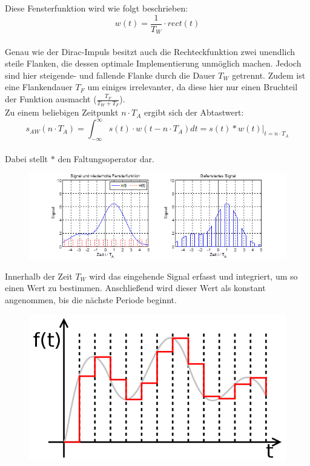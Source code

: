 Diese Fensterfunktion wird wie folgt beschrieben:\\
$$w(t) = \frac{1}{T_W} \cdot rect(t)$$\\
Genau wie der Dirac-Impuls besitzt auch die Rechteckfunktion zwei unendlich steile Flanken, die dessen optimale Implementierung unmöglich machen. Jedoch sind hier steigende- und fallende Flanke durch die Dauer $T_W$ getrennt. Zudem ist eine Flankendauer $T_F$  um einiges irrelevanter, da diese hier nur einen Bruchteil der Funktion ausmacht ($\frac{T_F}{T_W + T_F}$). \\
\newline
Zu einem beliebigen Zeitpunkt $n \cdot T_A$ ergibt sich der Abtastwert:\\
$$s_{AW}(n \cdot T_A) = \int_{-\infty}^{\infty} s(t) \cdot w(t - n \cdot T_A)dt = s(t) * w(t)|_{t = n \cdot T_A}$$ \\
Dabei stellt $*$ den Faltungsoperator dar.

\begin{figure}[h!]
\centering
\includegraphics[scale=1]{images/abtastung_real.png}
\label{real_abtastung}
\end{figure}

Innerhalb der Zeit $T_W$ wird das eingehende Signal erfasst und integriert, um so einen Wert zu bestimmen. Anschließend wird dieser Wert als konstant angenommen, bis die nächste Periode beginnt. 

\begin{figure}[h!]
\centering
\includegraphics[scale=0.4]{images/sah_signal.png}
\label{sah_signal}
\end{figure}

